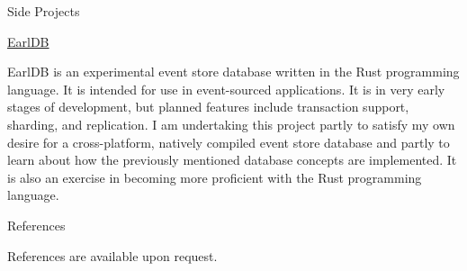 \documentclass{article}
\begin{document}
    \bigskip\bigskip\bigskip

    {
        \noindent\Large
        Side Projects
    }

    \noindent\makebox[\linewidth]{\rule{\textwidth}{0.4pt}}
    \medskip

    {
        \large
        \href{https://bitbucket.org/past9systems/earldb}{EarlDB}
    }

    \medskip

    EarlDB is an experimental event store database written in the Rust programming language. It is intended for use in event-sourced applications. It is in very early stages of development, but planned features include transaction support, sharding, and replication. I am undertaking this project partly to satisfy my own desire for a cross-platform, natively compiled event store database and partly to learn about how the previously mentioned database concepts are implemented. It is also an exercise in becoming more proficient with the Rust programming language.


    \bigskip\bigskip\bigskip

    {
        \noindent\Large
        References
    }

    \noindent\makebox[\linewidth]{\rule{\textwidth}{0.4pt}}
    \medskip

    References are available upon request.
\end{document}
